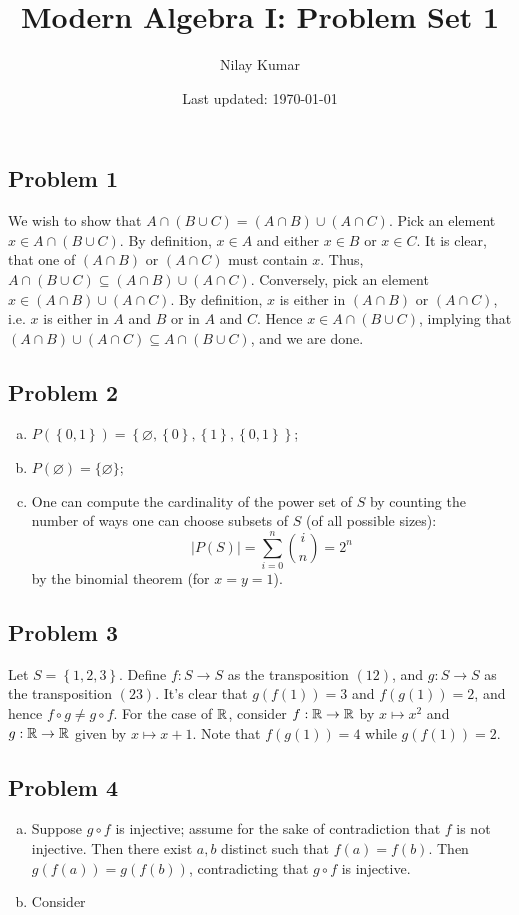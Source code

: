 \documentclass{../../mathnotes}
\title{Modern Algebra I: Problem Set 1}
\author{Nilay Kumar}
\date{Last updated: \today}
\begin{document}
\maketitle

\subsection*{Problem 1}

We wish to show that $A\cap (B\cup C)=(A\cap B)\cup(A\cap C)$. Pick an element $x\in A\cap(B\cup C)$. By definition,
$x\in A$ and either $x\in B$ or $x\in C$. It is clear, that one of $(A\cap B)$ or $(A\cap C)$ must contain $x$.
Thus, $A\cap(B\cup C)\subseteq (A\cap B)\cup(A\cap C)$. Conversely, pick an element $x\in(A\cap B)\cup(A\cap C)$.
By definition, $x$ is either in $(A\cap B)$ or $(A\cap C)$, i.e. $x$ is either in $A$ and $B$ or in $A$ and $C$.
Hence $x\in A\cap(B\cup C)$, implying that $(A\cap B)\cup(A\cap C)\subseteq A\cap(B\cup C)$, and we are done.

\subsection*{Problem 2}

\begin{enumerate}[(a)]
    \item $P(\left\{ 0,1 \right\})=\left\{\varnothing, \left\{ 0 \right\},\left\{ 1 \right\},\left\{ 0,1 \right\} \right\}$;
    \item $P(\varnothing)=\{\varnothing\}$;
    \item One can compute the cardinality of the power set of $S$ by counting the number of ways one can choose subsets of $S$
        (of all possible sizes):
        \begin{equation*}
            |P(S)|=\sum_{i=0}^n \binom{i}{n}=2^n
        \end{equation*}
        by the binomial theorem (for $x=y=1$).
\end{enumerate}

\subsection*{Problem 3}

Let $S=\left\{ 1,2,3 \right\}$. Define $f:S\to S$ as the transposition $(12)$, and $g:S\to S$ as the transposition $(23)$.
It's clear that $g(f(1))=3$ and $f(g(1))=2$, and hence $f\circ g\neq g\circ f$. For the case of $\mathbb{R}$, consider $f:\mathbb{R}\to\mathbb{R}$
by $x\mapsto x^2$ and $g:\mathbb{R}\to\mathbb{R}$ given by $x\mapsto x+1$. Note that $f(g(1))=4$ while $g(f(1))=2$.

\subsection*{Problem 4}

\begin{enumerate}[(a)]
    \item Suppose $g\circ f$ is injective; assume for the sake of contradiction that $f$ is not injective. Then there
        exist $a,b$ distinct such that $f(a)=f(b)$. Then $g(f(a))=g(f(b))$, contradicting that $g\circ f$ is injective.
    \item Consider 
\end{enumerate}
\end{document}
